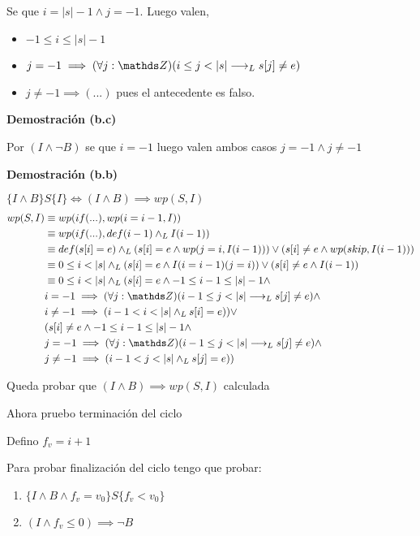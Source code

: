 Se que $ i = |s|-1 \wedge j = -1 $. Luego valen,
\begin{itemize}
    \item $ -1 \leq i \leq |s|-1 $
    \item $ j = -1 \implies  (\forall j: \ent)(i \leq j < |s| \implicaLuego s[j] \neq e) $
    \item $ j \neq -1 \implies (...) $ pues el antecedente es falso.
\end{itemize}

\textbf{Demostración (b.c)}

Por $ (I \wedge \neg B) $ se que $ i = -1 $ luego valen ambos casos $ j = -1 \wedge j \neq -1 $

\textbf{Demostración (b.b)}

$ \{ I \wedge B \} S \{ I \} \iff (I \wedge B) \implies wp(S, I) $
\begin{align*}
    wp(S, I) &\equiv wp(if(...), wp(i=i-1, I)) \\
    &\equiv wp(if(...), def(i-1) \yLuego I(i-1)) \\
    &\equiv def(s[i]=e) \yLuego (s[i]=e \wedge wp(j=i, I(i-1))) \vee (s[i]\neq e \wedge wp(skip, I(i-1))) \\
    &\equiv 0 \leq i < |s| \yLuego (s[i]=e \wedge I(i = i-1)(j = i)) \vee (s[i]\neq e \wedge I(i-1)) \\
    &\equiv 0 \leq i < |s| \yLuego (s[i]=e \wedge -1 \leq i-1 \leq |s|-1 \wedge \\ 
    &i = -1 \implies (\forall j: \ent)(i-1 \leq j < |s| \implicaLuego s[j] \neq e) \wedge \\ 
    &i \neq -1 \implies (i-1 < i < |s| \yLuego s[i] = e)) \vee \\
    &(s[i]\neq e \wedge -1 \leq i-1 \leq |s|-1 \wedge \\
    &j = -1 \implies (\forall j: \ent)(i-1 \leq j < |s| \implicaLuego s[j] \neq e) \wedge \\
    &j \neq -1 \implies (i-1 < j < |s| \yLuego s[j] = e)) \\
\end{align*}

Queda probar que $ (I \wedge B) \implies wp(S,I) $ calculada

Ahora pruebo terminación del ciclo

Defino $ f_v = i+1 $

Para probar finalización del ciclo tengo que probar:
\begin{enumerate}[label=(\alph*)]
    \item $ \{ I \wedge B \wedge f_v = v_0 \} S \{ f_v < v_0 \} $
    \item $ (I \wedge f_v \leq 0) \implies \neg B $
\end{enumerate}

